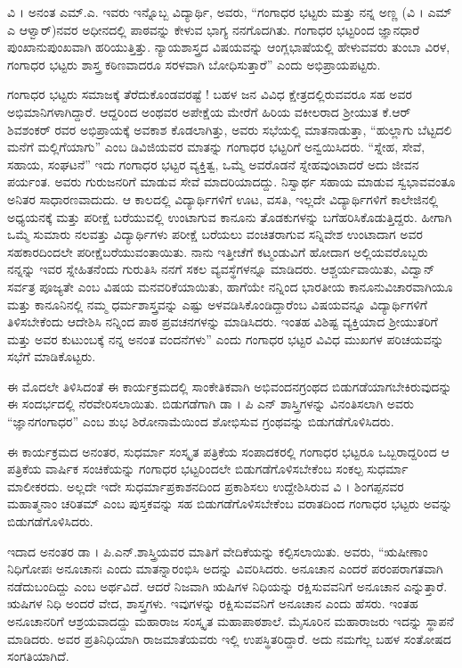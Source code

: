 {ವಿ । ಅನಂತ ಎಮ್.ಎ. ಇವರು ಇನ್ನೊಬ್ಬ ವಿದ್ಯಾರ್ಥಿ, ಅವರು, “ಗಂಗಾಧರ ಭಟ್ಟರು ಮತ್ತು ನನ್ನ ಅಣ್ಣ (ವಿ । ಎಮ್ ಎ ಆಳ್ವಾರ್)ನವರ ಅಧೀನದಲ್ಲಿ ಪಾಠವನ್ನು ಕೇಳುವ ಭಾಗ್ಯ ನನಗೊದಗಿತು. ಗಂಗಾಧರ ಭಟ್ಟರಿಂದ ಜ್ಞಾನಧಾರೆ ಪುಂಖಾನುಪುಂಖ\-ವಾಗಿ ಹರಿಯುತ್ತಿತ್ತು. ನ್ಯಾಯಶಾಸ್ತ್ರದ ವಿಷಯವನ್ನು ಆಂಗ್ಲಭಾಷೆಯಲ್ಲಿ ಹೇಳುವವರು ತುಂಬಾ ವಿರಳ, ಗಂಗಾಧರ ಭಟ್ಟರು ಶಾಸ್ತ್ರ ಕಠಿಣವಾದರೂ ಸರಳವಾಗಿ ಬೋಧಿಸುತ್ತಾರೆ” ಎಂದು ಅಭಿಪ್ರಾಯಪಟ್ಟರು.

ಗಂಗಾಧರ ಭಟ್ಟರು ಸಮಾಜಕ್ಕೆ ತೆರೆದುಕೊಂಡವರಷ್ಟೆ ! ಬಹಳ ಜನ ವಿವಿಧ ಕ್ಷೇತ್ರ\-ದಲ್ಲಿರುವವರೂ ಸಹ ಅವರ ಅಭಿಮಾನಿಗಳಾಗಿದ್ದಾರೆ. ಆದ್ದರಿಂದ ಅಂಥವರ ಅಪೇಕ್ಷೆಯ ಮೇರೆಗೆ ಹಿರಿಯ ವಕೀಲರಾದ ಶ್ರೀಯುತ ಕೆ.ಆರ್ ಶಿವಶಂಕರ್ ರವರ ಅಭಿಪ್ರಾಯಕ್ಕೆ ಅವಕಾಶ ಕೊಡಲಾಗಿತ್ತು, ಅವರು ಸಭೆಯಲ್ಲಿ ಮಾತನಾಡುತ್ತಾ, “ಹುಲ್ಲಾಗು  ಬೆಟ್ಟದಲಿ ಮನೆಗೆ ಮಲ್ಲಿಗೆಯಾಗು” ಎಂಬ ಡಿವಿಜಿಯವರ ಮಾತನ್ನು ಗಂಗಾಧರ ಭಟ್ಟರಿಗೆ ಅನ್ವಯಿಸಿದರು. “ಸ್ನೇಹ, ಸೇವೆ, ಸಹಾಯ, ಸಂಘಟನೆ” ಇದು ಗಂಗಾಧರ ಭಟ್ಟರ ವ್ಯಕ್ತಿತ್ವ, ಒಮ್ಮೆ ಅವರೊಡನೆ ಸ್ನೇಹವುಂಟಾದರೆ ಅದು ಜೀವನ ಪರ್ಯಂತ. ಅವರು ಗುರುಜನರಿಗೆ ಮಾಡುವ ಸೇವೆ ಮಾದರಿಯಾದದ್ದು. ನಿಸ್ವಾರ್ಥ ಸಹಾಯ ಮಾಡುವ ಸ್ವಭಾವವಂತೂ ಅನಿತರ ಸಾಧಾರಣವಾದುದು. ಆ ಕಾಲದಲ್ಲಿ ವಿದ್ಯಾರ್ಥಿಗಳಿಗೆ ಊಟ, ವಸತಿ, ಇಲ್ಲದೇ ವಿದ್ಯಾರ್ಥಿಗಳಿಗೆ ಕಾಲೇಜಿನಲ್ಲಿ ಅಧ್ಯಯನಕ್ಕೆ ಮತ್ತು ಪರೀಕ್ಷೆ ಬರೆಯುವಲ್ಲಿ  ಉಂಟಾಗುವ ಕಾನೂನು ತೊಡಕುಗಳನ್ನು ಬಗೆಹರಿಸಿಕೊಡುತ್ತಿದ್ದರು. ಹೀಗಾಗಿ ಒಮ್ಮೆ ಸುಮಾರು ನಲವತ್ತು ವಿದ್ಯಾರ್ಥಿಗಳು ಪರೀಕ್ಷೆ ಬರೆಯಲು ವಂಚಿತರಾಗುವ ಸನ್ನಿವೇಶ ಉಂಟಾದಾಗ ಅವರ ಸಹಕಾರದಿಂದಲೇ ಪರೀಕ್ಷೆಬರೆಯುವಂತಾಯಿತು. ನಾನು ಇತ್ತೀಚೆಗೆ ಕಟ್ಮಂಡುವಿಗೆ ಹೋದಾಗ ಅಲ್ಲಿಯವರೊಬ್ಬರು ನನ್ನನ್ನು ಇವರ ಸ್ನೇಹಿತನೆಂದು ಗುರುತಿಸಿ ನನಗೆ ಸಕಲ ವ್ಯವಸ್ಥೆಗಳನ್ನೂ ಮಾಡಿದರು. ಆಶ್ಚರ್ಯವಾಯಿತು, ವಿದ್ವಾನ್ ಸರ್ವತ್ರ ಪೂಜ್ಯತೇ ಎಂಬ ವಿಷಯ ಮನವರಿಕೆಯಾಯಿತು, ಹಾಗೆಯೇ ನನ್ನಿಂದ ಭಾರತೀಯ ಕಾನೂನು\break ವಿಚಾರವಾಗಿಯೂ ಮತ್ತು ಕಾನೂನಿನಲ್ಲಿ ನಮ್ಮ ಧರ್ಮಶಾಸ್ತ್ರವನ್ನು ಎಷ್ಟು ಅಳವಡಿಸಿಕೊಂಡಿದ್ದಾರೆಂಬ ವಿಷಯವನ್ನೂ ವಿದ್ಯಾರ್ಥಿಗಳಿಗೆ ತಿಳಿಸಬೇಕೆಂದು ಆದೇಶಿಸಿ ನನ್ನಿಂದ ಪಾಠ \enginline{-} ಪ್ರವಚನಗಳನ್ನು ಮಾಡಿಸಿದರು. ಇಂತಹ ವಿಶಿಷ್ಟ ವ್ಯಕ್ತಿಯಾದ ಶ್ರೀಯುತರಿಗೆ ಮತ್ತು ಅವರ ಕುಟುಂಬಕ್ಕೆ ನನ್ನ ಅನಂತ ವಂದನೆಗಳು” ಎಂದು ಗಂಗಾಧರ ಭಟ್ಟರ ವಿವಿಧ ಮುಖಗಳ ಪರಿಚಯವನ್ನು ಸಭೆಗೆ ಮಾಡಿಕೊಟ್ಟರು.

ಈ ಮೊದಲೇ ತಿಳಿಸಿದಂತೆ ಈ ಕಾರ್ಯಕ್ರಮದಲ್ಲಿ ಸಾಂಕೇತಿಕವಾಗಿ ಅಭಿವಂದನ\-ಗ್ರಂಥದ ಬಿಡುಗಡೆಯಾಗಬೇಕಿರುವುದನ್ನು ಈ ಸಂದರ್ಭದಲ್ಲಿ ನೆರವೇರಿಸಲಾಯಿತು. ಬಿಡುಗಡೆಗಾಗಿ ಡಾ । ಪಿ ಎನ್ ಶಾಸ್ತ್ರಿಗಳನ್ನು ವಿನಂತಿಸಲಾಗಿ ಅವರು “ಜ್ಞಾನಗಂಗಾಧರ” ಎಂಬ ಶುಭ ಶಿರೋನಾಮೆಯಿಂದ ಶೋಭಿಸುವ ಗ್ರಂಥವನ್ನು ಬಿಡುಗಡೆಗೊಳಿಸಿದರು. 

ಈ ಕಾರ್ಯಕ್ರಮದ ಅನಂತರ, ಸುಧರ್ಮಾ ಸಂಸ್ಕೃತ ಪತ್ರಿಕೆಯ ಸಂಪಾದಕರಲ್ಲಿ ಗಂಗಾಧರ ಭಟ್ಟರೂ ಒಬ್ಬರಾದ್ದರಿಂದ ಆ ಪತ್ರಿಕೆಯ ವಾರ್ಷಿಕ ಸಂಚಿಕೆಯನ್ನು ಗಂಗಾಧರ ಭಟ್ಟರಿಂದಲೇ ಬಿಡುಗಡೆಗೊಳಿಸಬೇಕೆಂಬ ಸಂಕಲ್ಪ ಸುಧರ್ಮಾ ಮಾಲೀಕರದು. ಅಲ್ಲದೇ ಇದೇ ಸುಧರ್ಮಾಪ್ರಕಾಶನದಿಂದ ಪ್ರಕಾಶಿಸಲು ಉದ್ದೇಶಿಸಿರುವ ವಿ । ಶಿಂಗಪ್ಪನವರ ಮಹಾತ್ಮನಾಂ ಚರಿತಮ್ ಎಂಬ ಪುಸ್ತಕವನ್ನು ಸಹ ಬಿಡುಗಡೆಗೊಳಿಸಬೇಕೆಂಬ ವರಾತದಿಂದ ಗಂಗಾಧರ ಭಟ್ಟರು ಅವನ್ನು ಬಿಡುಗಡೆಗೊಳಿಸಿದರು.
\vskip 5pt

ಇದಾದ ಅನಂತರ ಡಾ । ಪಿ.ಎನ್.ಶಾಸ್ತ್ರಿಯವರ ಮಾತಿಗೆ ವೇದಿಕೆಯನ್ನು ಕಲ್ಪಿಸ\-ಲಾಯಿತು. ಅವರು, “ಋಷೀಣಾಂ ನಿಧಿಗೋಪಃ ಅನೂಚಾನಃ ಎಂದು \hbox{ಮಾತನ್ನಾರಂಭಿಸಿ} ಅದನ್ನು ವಿವರಿಸಿದರು. ಅನೂಚಾನ ಎಂದರೆ ಪರಂಪರಾಗತವಾಗಿ ನಡೆದುಬಂದಿದ್ದು ಎಂಬ ಅರ್ಥವಿದೆ. ಆದರೆ ನಿಜವಾಗಿ ಋಷಿಗಳ ನಿಧಿಯನ್ನು ರಕ್ಷಿಸುವವನಿಗೆ ಅನೂಚಾನ ಎನ್ನುತ್ತಾರೆ. ಋಷಿಗಳ ನಿಧಿ ಅಂದರೆ \enginline{-} ವೇದ, ಶಾಸ್ತ್ರಗಳು. ಇವುಗಳನ್ನು ರಕ್ಷಿಸುವವನಿಗೆ ಅನೂಚಾನ ಎಂದು ಹೆಸರು. ಇಂತಹ ಅನೂಚಾನರಿಗೆ ಆಶ್ರಯವಾದದ್ದು ಮಹಾರಾಜ ಸಂಸ್ಕೃತ ಮಹಾಪಾಠಶಾಲೆ. ಮೈಸೂರಿನ ಮಹಾರಾಜರು ಇದನ್ನು ಸ್ಥಾಪನೆ ಮಾಡಿದರು. ಅವರ ಪ್ರತಿನಿಧಿಯಾಗಿ ರಾಜಮಾತೆಯವರು ಇಲ್ಲಿ ಉಪಸ್ಥಿತರಿದ್ದಾರೆ. ಅದು ನಮಗೆಲ್ಲ ಬಹಳ ಸಂತೋಷದ ಸಂಗತಿಯಾಗಿದೆ. 
\vskip 5pt

}
